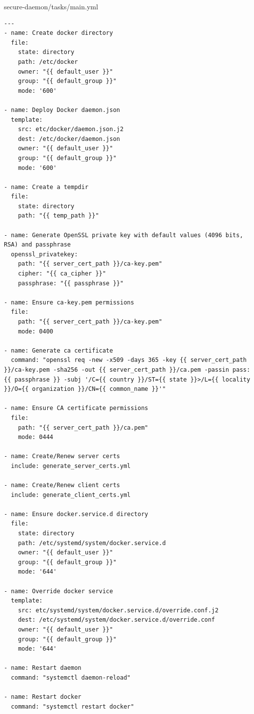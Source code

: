 secure-daemon/tasks/main.yml
\begin{verbatim}
---
- name: Create docker directory
  file:
    state: directory
    path: /etc/docker
    owner: "{{ default_user }}"
    group: "{{ default_group }}"
    mode: '600'

- name: Deploy Docker daemon.json
  template:
    src: etc/docker/daemon.json.j2
    dest: /etc/docker/daemon.json
    owner: "{{ default_user }}"
    group: "{{ default_group }}"
    mode: '600'

- name: Create a tempdir
  file:
    state: directory
    path: "{{ temp_path }}"

- name: Generate OpenSSL private key with default values (4096 bits, RSA) and passphrase
  openssl_privatekey:
    path: "{{ server_cert_path }}/ca-key.pem"
    cipher: "{{ ca_cipher }}"
    passphrase: "{{ passphrase }}"

- name: Ensure ca-key.pem permissions
  file:
    path: "{{ server_cert_path }}/ca-key.pem"
    mode: 0400

- name: Generate ca certificate   
  command: "openssl req -new -x509 -days 365 -key {{ server_cert_path }}/ca-key.pem -sha256 -out {{ server_cert_path }}/ca.pem -passin pass:{{ passphrase }} -subj '/C={{ country }}/ST={{ state }}>/L={{ locality }}/O={{ organization }}/CN={{ common_name }}'"

- name: Ensure CA certificate permissions
  file:
    path: "{{ server_cert_path }}/ca.pem"
    mode: 0444

- name: Create/Renew server certs
  include: generate_server_certs.yml

- name: Create/Renew client certs
  include: generate_client_certs.yml

- name: Ensure docker.service.d directory
  file:
    state: directory
    path: /etc/systemd/system/docker.service.d
    owner: "{{ default_user }}"
    group: "{{ default_group }}"
    mode: '644'

- name: Override docker service
  template:
    src: etc/systemd/system/docker.service.d/override.conf.j2
    dest: /etc/systemd/system/docker.service.d/override.conf
    owner: "{{ default_user }}"
    group: "{{ default_group }}"
    mode: '644'

- name: Restart daemon
  command: "systemctl daemon-reload"

- name: Restart docker
  command: "systemctl restart docker"
\end{verbatim}


